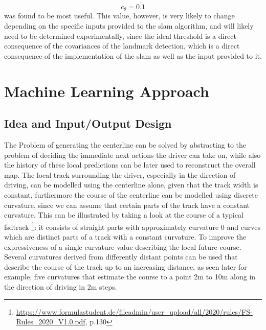 $$c_\theta = 0.1$$
was found to be most useful. This value, however, is very likely to change depending on the specific inputs provided to the \ac{slam} algorithm, and will likely need to be determined experimentally, since the ideal threshold is a direct consequence of the covariances of the landmark detection, which is a direct consequence of the implementation of the \ac{slam} as well as the input provided to it.


\section{Machine Learning Approach}
\subsection{Idea and Input/Output Design}
The Problem of generating the centerline can be solved by abstracting to the problem of deciding the immediate next actions the driver can take on, while also the history of these local predictions can be later used to reconstruct the overall map. The local track surrounding the driver, especially in the direction of driving, can be modelled using the centerline alone, given that the track width is constant, furthermore the course of the centerline can be modelled using discrete curvature, since we can assume that certain parts of the track have a constant curvature. This can be illustrated by taking a look at the course of a typical \ac{fsd}track \footnote{\url{https://www.formulastudent.de/fileadmin/user_upload/all/2020/rules/FS-Rules_2020_V1.0.pdf}, p.130}: it consists of straight parts with approximately curvature 0 and curves which are distinct parts of a track with a constant curvature. To improve the expressiveness of a single curvature value describing the local future course. Several curvatures derived from differently distant points can be used that describe the course of the track up to an increasing distance, as seen later for example, five curvatures that estimate the course to a point 2m to 10m along in the direction of driving in 2m steps.

